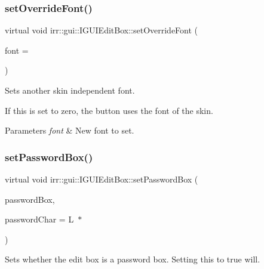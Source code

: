 \subsubsection{\texorpdfstring{set\+Override\+Font()}{setOverrideFont()}\hspace{0.1cm}{\footnotesize\ttfamily [2/2]}}
{\footnotesize\ttfamily virtual void irr\+::gui\+::\+I\+G\+U\+I\+Edit\+Box\+::set\+Override\+Font (\begin{DoxyParamCaption}\item[{\hyperlink{classirr_1_1gui_1_1IGUIFont}{I\+G\+U\+I\+Font} $\ast$}]{font = {} }\end{DoxyParamCaption})\hspace{0.3cm}{\ttfamily [pure virtual]}}



Sets another skin independent font. 

If this is set to zero, the button uses the font of the skin. 
\begin{DoxyParams}{Parameters}
{\em font} & New font to set. \\
\hline
\end{DoxyParams}
\mbox{\label{classirr_1_1gui_1_1IGUIEditBox_a755baeca9941267fe11b0c0598b772bf}} 
\subsubsection{\texorpdfstring{set\+Password\+Box()}{setPasswordBox()}\hspace{0.1cm}{\footnotesize\ttfamily [1/2]}}
{\footnotesize\ttfamily virtual void irr\+::gui\+::\+I\+G\+U\+I\+Edit\+Box\+::set\+Password\+Box (\begin{DoxyParamCaption}\item[{bool}]{password\+Box,  }\item[{wchar\+\_\+t}]{password\+Char = {\ttfamily L\textquotesingle{}~$\ast$\textquotesingle{}} }\end{DoxyParamCaption})\hspace{0.3cm}{\ttfamily [pure virtual]}}



Sets whether the edit box is a password box. Setting this to true will. 

